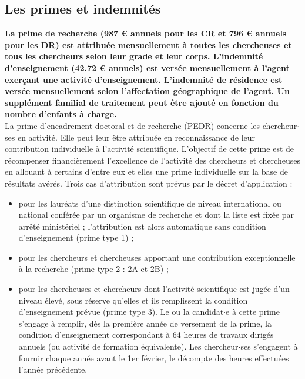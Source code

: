 \subsection{ Les primes et indemnit\'es}
{\bf La prime de recherche (987 \euro{}  annuels pour les CR et 796 \euro{}{}  annuels pour les DR) est attribu\'ee mensuellement \`a toutes les chercheuses et tous les chercheurs selon leur grade et leur corps. L'indemnit\'e d'enseignement (42.72 \euro{}{}  annuels) est vers\'ee mensuellement \`a l'agent exer\c{c}ant une activit\'e d'enseignement. L'indemnit\'e de r\'esidence est vers\'ee mensuellement selon l'affectation g\'eographique de l'agent. Un suppl\'ement familial de traitement peut \^etre ajout\'e en fonction du nombre d'enfants \`a charge.}\\

La prime d'encadrement doctoral et de recherche (PEDR) concerne les chercheur$\cdot$ses en activit\'e. Elle peut leur \^etre attribu\'ee en reconnaissance de leur contribution individuelle \`a l'activit\'e scientifique. L'objectif de cette prime est de r\'ecompenser financi\`erement l'excellence de l'activit\'e des chercheurs et chercheuses en allouant \`a certains d'entre eux et elles une prime individuelle sur la base de r\'esultats av\'er\'es. Trois cas d'attribution sont pr\'evus par le d\'ecret d'application :
\begin{itemize}
\item pour les laur\'eats d'une distinction scientifique de niveau international ou national conf\'er\'ee par un organisme de recherche et dont la liste est fix\'ee par arr\^et\'e minist\'eriel ; l'attribution est alors automatique sans condition d'enseignement (prime type 1) ;
\item pour les chercheurs et chercheuses apportant une contribution exceptionnelle \`a la recherche (prime type 2 : 2A et 2B) ;
\item pour les chercheuses et chercheurs dont l'activit\'e scientifique est jug\'ee d'un niveau \'elev\'e, sous r\'eserve qu'elles et ils remplissent la condition d'enseignement pr\'evue (prime type 3). Le ou la candidat$\cdot$e \`a cette prime s'engage \`a remplir, d\`es la premi\`ere ann\'ee de versement de la prime, la condition d'enseignement correspondant \`a 64 heures de travaux dirig\'es annuels (ou activit\'e de formation \'equivalente). Les chercheur$\cdot$ses s'engagent \`a fournir chaque ann\'ee avant le 1er f\'evrier, le d\'ecompte des heures effectu\'ees l'ann\'ee pr\'ec\'edente.
\end{itemize}

